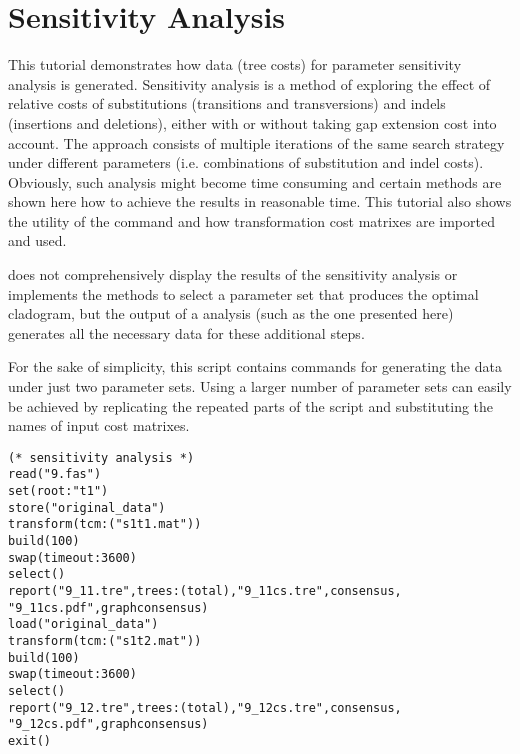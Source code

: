 
\section{Sensitivity Analysis}{\label{tutorial7}}

This tutorial demonstrates how data (tree costs) for parameter sensitivity analysis is generated. Sensitivity analysis 
\cite{wheeler1995} is a method of exploring the effect of relative costs of substitutions (transitions and 
transversions) and indels (insertions and deletions), either with or without taking gap extension cost into 
account. The approach consists of multiple iterations of the same search strategy under different parameters 
(i.e. combinations of substitution and indel costs).  Obviously, such analysis might become time 
consuming and certain methods are shown here how to achieve the results in reasonable time. This tutorial also
 shows the utility of the command  and how transformation cost matrixes are imported and 
 used.

\poy does not comprehensively display the results of the sensitivity analysis or implements the methods to select 
a parameter set that produces the optimal cladogram, but the output of a \poy analysis (such as the one 
presented here) generates all the necessary data for these additional steps.

For the sake of simplicity, this script contains commands for generating the data under just two parameter  sets. 
Using a larger number of parameter sets can easily be achieved by replicating the repeated parts of the script 
and substituting the names of input cost matrixes.

\begin{verbatim}
(* sensitivity analysis *)
read("9.fas")
set(root:"t1")
store("original_data")
transform(tcm:("s1t1.mat"))
build(100)
swap(timeout:3600)
select()
report("9_11.tre",trees:(total),"9_11cs.tre",consensus,
"9_11cs.pdf",graphconsensus)
load("original_data")
transform(tcm:("s1t2.mat"))
build(100)
swap(timeout:3600)
select()
report("9_12.tre",trees:(total),"9_12cs.tre",consensus,
"9_12cs.pdf",graphconsensus)
exit()
\end{verbatim}

